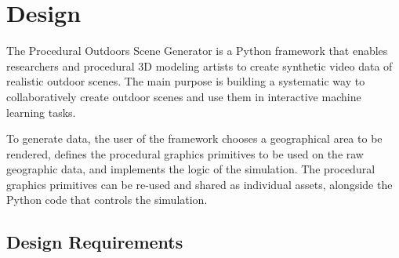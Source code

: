 \chapter{Design}
\label{chapter:design}


The Procedural Outdoors Scene Generator is a Python framework that enables researchers and procedural 3D modeling artists to create synthetic video data of realistic outdoor scenes. The main purpose is building a systematic way to collaboratively create outdoor scenes and use them in interactive machine learning tasks.


To generate data, the user of the framework chooses a geographical area to be rendered, defines the procedural graphics primitives to be used on the raw geographic data, and implements the logic of the simulation. The procedural graphics primitives can be re-used and shared as individual assets, alongside the Python code that controls the simulation.

\section{Design Requirements}
\label{sec:design-requirements}


